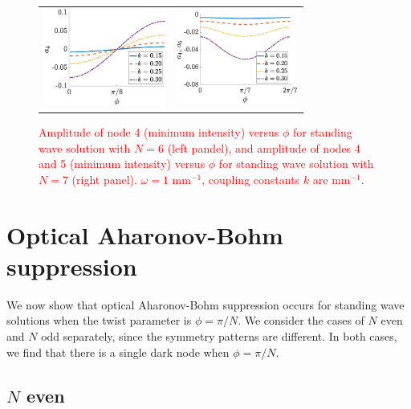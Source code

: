 \documentclass[reprint, amsmath,amssymb,aps,pra]{revtex4-2}
\renewcommand{\revised}[1]{ \textcolor{red}{#1} }
\begin{document}
\begin{figure}
    \begin{center}
    \begin{tabular}{cc}
    \includegraphics[width=4cm]{images/ABsuppression.eps} &
    \includegraphics[width=4cm]{images/noABsuppression.eps} 
    \end{tabular}
    \end{center}
    \caption{\revised{Amplitude of node 4 (minimum intensity) versus $\phi$ for standing wave solution with $N=6$ (left pandel), and amplitude of nodes 4 and 5 (minimum intensity) versus $\phi$ for standing wave solution with $N=7$ (right panel). $\omega = 1 \text{ mm}^{-1}$, coupling constants $k$ are $\text{mm}^{-1}$.}}
    \label{fig:ABsuppression}
\end{figure}

\section{Optical Aharonov-Bohm suppression}\label{sec:ABsupp}

We now show that optical Aharonov-Bohm suppression occurs for standing wave solutions when the twist parameter is $\phi = \pi/N$. We consider the cases of $N$ even and $N$ odd separately, since the symmetry patterns are different. In both cases, we find that there is a single dark node when $\phi = \pi/N$.

\subsection{\texorpdfstring{$N$}{N} even}\label{sec:Neven}
\end{document}
